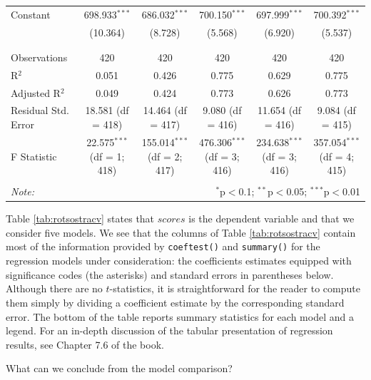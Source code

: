 \documentclass[]{book}
\theoremstyle{definition}
\theoremstyle{definition}
\theoremstyle{definition}
\theoremstyle{remark}
\begin{document}
\begin{table}
\begin{tabular}{@{\extracolsep{-10pt}}lccccc}
 Constant & 698.933$^{***}$ & 686.032$^{***}$ & 700.150$^{***}$ & 697.999$^{***}$ & 700.392$^{***}$ \\ 
  & (10.364) & (8.728) & (5.568) & (6.920) & (5.537) \\ 
  & & & & & \\ 
\hline \\[-1.8ex] 
Observations & 420 & 420 & 420 & 420 & 420 \\ 
R$^{2}$ & 0.051 & 0.426 & 0.775 & 0.629 & 0.775 \\ 
Adjusted R$^{2}$ & 0.049 & 0.424 & 0.773 & 0.626 & 0.773 \\ 
Residual Std. Error & 18.581 (df = 418) & 14.464 (df = 417) & 9.080 (df = 416) & 11.654 (df = 416) & 9.084 (df = 415) \\ 
F Statistic & 22.575$^{***}$ (df = 1; 418) & 155.014$^{***}$ (df = 2; 417) & 476.306$^{***}$ (df = 3; 416) & 234.638$^{***}$ (df = 3; 416) & 357.054$^{***}$ (df = 4; 415) \\ 
\hline 
\hline \\[-1.8ex] 
\textit{Note:}  & \multicolumn{5}{r}{$^{*}$p$<$0.1; $^{**}$p$<$0.05; $^{***}$p$<$0.01} \\ 
\end{tabular} 
\end{table}

Table \ref{tab:rotsostracv} states that \(scores\) is the dependent
variable and that we consider five models. We see that the columns of
Table \ref{tab:rotsostracv} contain most of the information provided by
\texttt{coeftest()} and \texttt{summary()} for the regression models
under consideration: the coefficients estimates equipped with
significance codes (the asterisks) and standard errors in parentheses
below. Although there are no \(t\)-statistics, it is straightforward for
the reader to compute them simply by dividing a coefficient estimate by
the corresponding standard error. The bottom of the table reports
summary statistics for each model and a legend. For an in-depth
discussion of the tabular presentation of regression results, see
Chapter 7.6 of the book.

What can we conclude from the model comparison?
\end{document}
